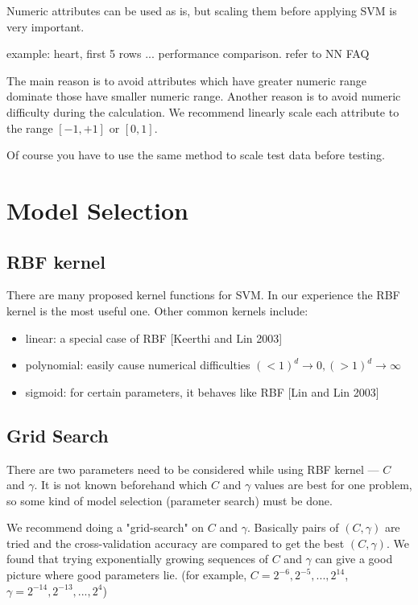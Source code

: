 \documentclass[12pt]{article}
\begin{document}
Numeric attributes can be used as is, but
scaling them before applying SVM is very important.

example: heart, first 5 rows ... 
performance comparison.
refer to NN FAQ

The main reason is to avoid attributes which have 
greater numeric range dominate those have 
smaller numeric range. Another reason is to 
avoid numeric difficulty during the calculation. 
We recommend linearly scale each attribute to 
the range $[-1,+1]$ or $[0,1]$.

Of course you have to use the same method to 
scale test data before testing.

\section{Model Selection}

\subsection{RBF kernel}
There are many proposed kernel functions for 
SVM. In our experience the RBF kernel is the 
most useful one. Other common kernels include:

\begin{itemize}
\item linear: a special case of RBF [Keerthi and Lin 2003]
\item polynomial: easily cause numerical difficulties
$(<1)^d \rightarrow 0, (>1)^d \rightarrow \infty$
\item sigmoid:  for certain parameters, it behaves like RBF [Lin and Lin 2003]
\end{itemize}

\subsection{Grid Search}
There are two parameters need to be considered 
while using RBF kernel ---  $C$ and $\gamma$. 
It is not known beforehand  which $C$ and 
$\gamma$ values are best for one problem, 
so some kind of model selection 
(parameter search) must be done. 

We recommend doing a "grid-search" on $C$ and
$\gamma$. Basically pairs of $(C,\gamma)$ are tried 
and the cross-validation accuracy are compared to 
get the best $(C,\gamma)$. We found that trying
exponentially growing sequences of $C$ and $\gamma$
can give a good picture where good parameters lie.
(for example, $C=2^{-6},2^{-5},...,2^{14}$, 
$\gamma=2^{-14},2^{-13},...,2^4$)
\end{document}
